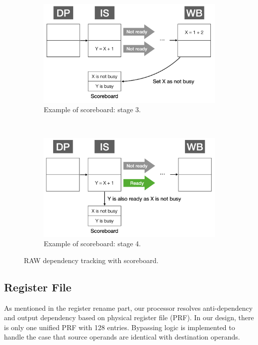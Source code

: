 \begin{figure}[!htp]
    \begin{subfigure}{0.4\textwidth}
        \includegraphics[width=\textwidth]{figure/sb3.png}
        \caption{Example of scoreboard: stage 3.}
        \label{fig:sb-3}
    \end{subfigure}
    ~
    \begin{subfigure}{0.4\textwidth}
        \includegraphics[width=\textwidth]{figure/sb4.png}
        \caption{Example of scoreboard: stage 4.}
        \label{fig:sb-4}
    \end{subfigure}
    \caption{RAW dependency tracking with scoreboard.}
    \label{fig:sb}
\end{figure}

\subsection{Register File} %

As mentioned in the register rename part, our processor resolves anti-dependency and output dependency based on physical register file (PRF). In our design, there is only one unified PRF with 128 entries. Bypassing logic is implemented to handle the case that source operands are identical with destination operands. 

